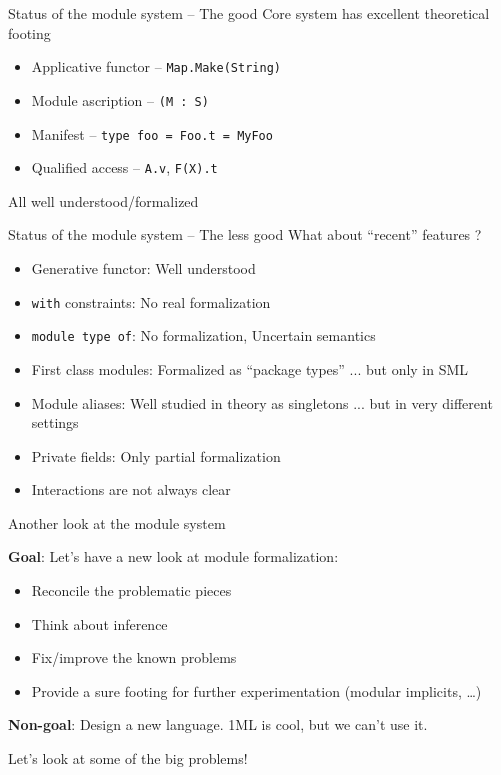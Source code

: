 \documentclass[aspectratio=169,dvipsnames,svgnames,10pt]{beamer}
\newcommand\Y{{\color{Green}{\ding{52}}}\xspace}
\newcommand\N{{\color{Red}{\ding{56}}}\xspace}
\begin{document}
\begin{frame}[fragile]{Status of the module system -- The good}
  Core system has excellent theoretical footing
  \begin{itemize}
  \item Applicative functor -- \texttt{Map.Make(String)}
  \item Module ascription -- \texttt{(M : S)}
  \item Manifest -- \texttt{type foo = Foo.t = MyFoo}
  \item Qualified access -- \texttt{A.v}, \texttt{F(X).t}
  \end{itemize}
  \Y All well understood/formalized
\end{frame}

\begin{frame}[fragile]{Status of the module system -- The less good}
  What about ``recent'' features ?
  \begin{itemize}
  \item Generative functor:
    Well understood \Y
  \item \texttt{with} constraints: 
    No real formalization \N
  \item \texttt{module type of}:
    No formalization, Uncertain semantics \N
  \item First class modules:
    Formalized as ``package types'' \Y ...
    but only in SML \N
  \item Module aliases:
    Well studied in theory as singletons \Y ...
    but in very different settings \N
  \item Private fields:
    Only partial formalization
  \item<2>
    Interactions are not always clear
  \end{itemize}
\end{frame}



\begin{frame}{Another look at the module system}

  \textbf{Goal}: Let's have a new look at module formalization:
  \begin{itemize}
  \item Reconcile the problematic pieces
  \item Think about inference
  \item Fix/improve the known problems
  \item Provide a sure footing for further experimentation (modular implicits, \dots)
  \end{itemize}

  \pause
  \textbf{Non-goal}: Design a new language. 1ML is cool, but we can't use it.

  \pause
  Let's look at some of the big problems!
\end{frame}
\end{document}
